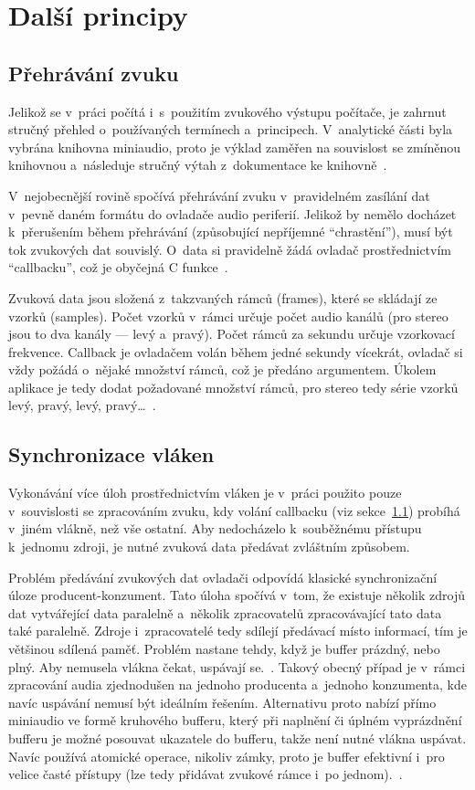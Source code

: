 \section{Další principy}
\subsection{Přehrávání zvuku}
\label{sec:zpracovani-zvuku}
Jelikož se v~práci počítá i~s~použitím zvukového výstupu počítače, je zahrnut stručný přehled o~používaných termínech a~principech. V~analytické části byla vybrána knihovna miniaudio, proto je výklad zaměřen na souvislost se zmíněnou knihovnou a~následuje stručný výtah z~dokumentace ke knihovně~\cite{Reid2023:miniaudio}.

V~nejobecnější rovině spočívá přehrávání zvuku v~pravidelném zasílání dat v~pevně daném formátu do ovladače audio periferií. Jelikož by nemělo docházet k~přerušením během přehrávání (způsobující nepříjemné \enquote{chrastění}), musí být tok zvukových dat souvislý. O~data si pravidelně žádá ovladač prostřednictvím \enquote{callbacku}, což je obyčejná C funkce~\cite{Reid2023:miniaudio}.

Zvuková data jsou složená z~takzvaných rámců (frames), které se skládají ze vzorků (samples). Počet vzorků v~rámci určuje počet audio kanálů (pro stereo jsou to dva kanály --- levý a~pravý). Počet rámců za sekundu určuje vzorkovací frekvence. Callback je ovladačem volán během jedné sekundy vícekrát, ovladač si vždy požádá o~nějaké množství rámců, což je předáno argumentem. Úkolem aplikace je tedy dodat požadované množství rámců, pro stereo tedy série vzorků levý, pravý, levý, pravý\dots ~\cite{Reid2023:miniaudio}.

\subsection{Synchronizace vláken}
Vykonávání více úloh prostřednictvím vláken je v~práci použito pouze v~souvislosti se zpracováním zvuku, kdy volání callbacku (viz sekce~\ref{sec:zpracovani-zvuku}) probíhá v~jiném vlákně, než vše ostatní. Aby nedocházelo k~souběžnému přístupu k~jednomu zdroji, je nutné zvuková data předávat zvláštním způsobem.

Problém předávání zvukových dat ovladači odpovídá klasické synchronizační úloze producent-konzument. Tato úloha spočívá v~tom, že existuje několik zdrojů dat vytvářející data paralelně a~několik zpracovatelů zpracovávající tato data také paralelně. Zdroje i~zpracovatelé tedy sdílejí předávací místo informací, tím je většinou sdílená paměť. Problém nastane tehdy, když je buffer prázdný, nebo plný. Aby nemusela vlákna čekat, uspávají se.~\cite{Tanenbaum2015:os}.  Takový obecný případ je v~rámci zpracování audia zjednodušen na jednoho producenta a~jednoho konzumenta, kde navíc uspávání nemusí být ideálním řešením. Alternativu proto nabízí přímo miniaudio ve formě kruhového bufferu, který při naplnění či úplném vyprázdnění bufferu je možné posouvat ukazatele do bufferu, takže není nutné vlákna uspávat.  Navíc používá atomické operace, nikoliv zámky, proto je buffer efektivní i~pro velice časté přístupy (lze tedy přidávat zvukové rámce i~po jednom).~\cite{Reid2023:miniaudio}.

